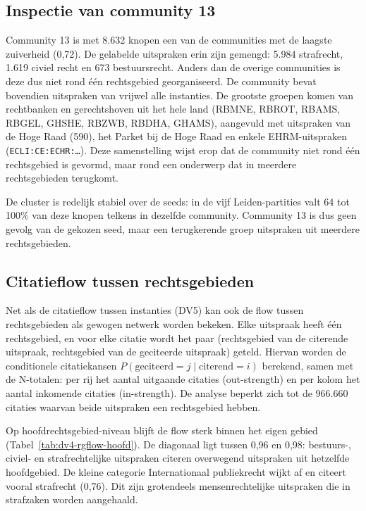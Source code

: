 \documentclass[a4paper, 12pt]{report}
\begin{document}
\subsection{Inspectie van community 13}
Community 13 is met 8.632 knopen een van de communities met de laagste zuiverheid (0,72). De gelabelde uitspraken erin zijn gemengd: 5.984 strafrecht, 1.619 civiel recht en 673 bestuursrecht. Anders dan de overige communities is deze dus niet rond één rechtsgebied georganiseerd. De community bevat bovendien uitspraken van vrijwel alle instanties. De grootste groepen komen van rechtbanken en gerechtshoven uit het hele land (RBMNE, RBROT, RBAMS, RBGEL, GHSHE, RBZWB, RBDHA, GHAMS), aangevuld met uitspraken van de Hoge Raad (590), het Parket bij de Hoge Raad en enkele EHRM-uitspraken (\texttt{ECLI:CE:ECHR:\ldots}). Deze samenstelling wijst erop dat de community niet rond één rechtsgebied is gevormd, maar rond een onderwerp dat in meerdere rechtsgebieden terugkomt.

De cluster is redelijk stabiel over de seeds: in de vijf Leiden-partities valt 64 tot 100\% van deze knopen telkens in dezelfde community. Community 13 is dus geen gevolg van de gekozen seed, maar een terugkerende groep uitspraken uit meerdere rechtsgebieden.



\subsection{Citatieflow tussen rechtsgebieden}
Net als de citatieflow tussen instanties (DV5) kan ook de flow tussen rechtsgebieden als gewogen netwerk worden bekeken. Elke uitspraak heeft één rechtsgebied, en voor elke citatie wordt het paar (rechtsgebied van de citerende uitspraak, rechtsgebied van de geciteerde uitspraak) geteld. Hiervan worden de conditionele citatiekansen $P(\text{geciteerd}=j \mid \text{citerend}=i)$ berekend, samen met de N-totalen: per rij het aantal uitgaande citaties (out-strength) en per kolom het aantal inkomende citaties (in-strength). De analyse beperkt zich tot de 966.660 citaties waarvan beide uitspraken een rechtsgebied hebben.

Op hoofdrechtsgebied-niveau blijft de flow sterk binnen het eigen gebied (Tabel~\ref{tab:dv4-rgflow-hoofd}). De diagonaal ligt tussen 0,96 en 0,98: bestuurs-, civiel- en strafrechtelijke uitspraken citeren overwegend uitspraken uit hetzelfde hoofdgebied. De kleine categorie Internationaal publiekrecht wijkt af en citeert vooral strafrecht (0,76). Dit zijn grotendeels mensenrechtelijke uitspraken die in strafzaken worden aangehaald.
\end{document}
